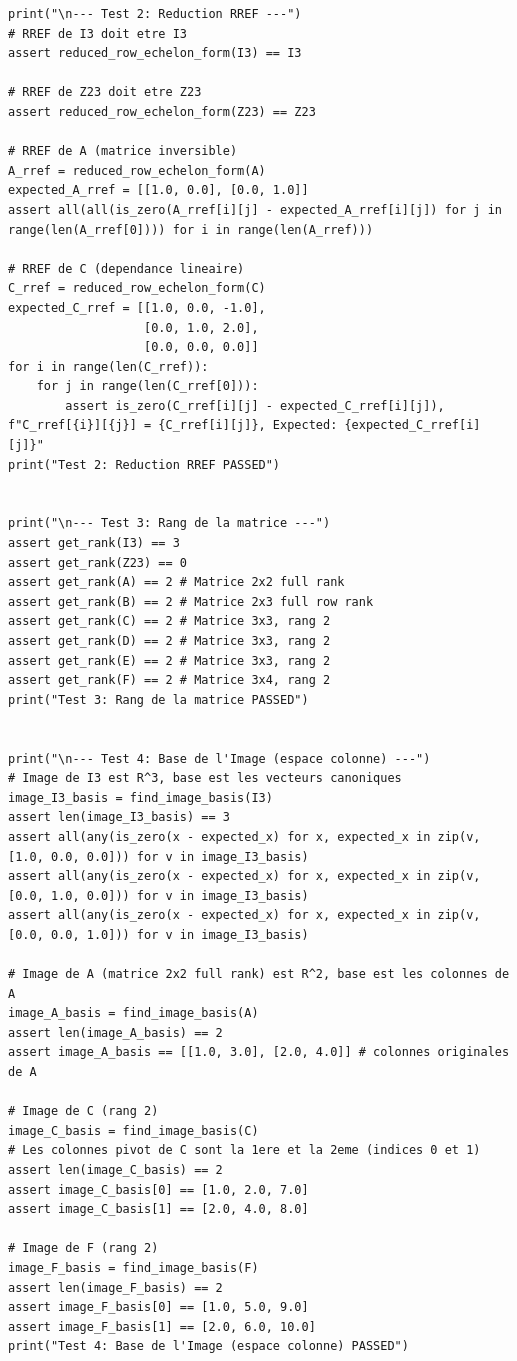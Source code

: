\documentclass{report}
\begin{document}
\begin{verbatim}
print("\n--- Test 2: Reduction RREF ---")
# RREF de I3 doit etre I3
assert reduced_row_echelon_form(I3) == I3

# RREF de Z23 doit etre Z23
assert reduced_row_echelon_form(Z23) == Z23

# RREF de A (matrice inversible)
A_rref = reduced_row_echelon_form(A)
expected_A_rref = [[1.0, 0.0], [0.0, 1.0]]
assert all(all(is_zero(A_rref[i][j] - expected_A_rref[i][j]) for j in range(len(A_rref[0]))) for i in range(len(A_rref)))

# RREF de C (dependance lineaire)
C_rref = reduced_row_echelon_form(C)
expected_C_rref = [[1.0, 0.0, -1.0],
                   [0.0, 1.0, 2.0],
                   [0.0, 0.0, 0.0]]
for i in range(len(C_rref)):
    for j in range(len(C_rref[0])):
        assert is_zero(C_rref[i][j] - expected_C_rref[i][j]), f"C_rref[{i}][{j}] = {C_rref[i][j]}, Expected: {expected_C_rref[i][j]}"
print("Test 2: Reduction RREF PASSED")


print("\n--- Test 3: Rang de la matrice ---")
assert get_rank(I3) == 3
assert get_rank(Z23) == 0
assert get_rank(A) == 2 # Matrice 2x2 full rank
assert get_rank(B) == 2 # Matrice 2x3 full row rank
assert get_rank(C) == 2 # Matrice 3x3, rang 2
assert get_rank(D) == 2 # Matrice 3x3, rang 2
assert get_rank(E) == 2 # Matrice 3x3, rang 2
assert get_rank(F) == 2 # Matrice 3x4, rang 2
print("Test 3: Rang de la matrice PASSED")


print("\n--- Test 4: Base de l'Image (espace colonne) ---")
# Image de I3 est R^3, base est les vecteurs canoniques
image_I3_basis = find_image_basis(I3)
assert len(image_I3_basis) == 3
assert all(any(is_zero(x - expected_x) for x, expected_x in zip(v, [1.0, 0.0, 0.0])) for v in image_I3_basis)
assert all(any(is_zero(x - expected_x) for x, expected_x in zip(v, [0.0, 1.0, 0.0])) for v in image_I3_basis)
assert all(any(is_zero(x - expected_x) for x, expected_x in zip(v, [0.0, 0.0, 1.0])) for v in image_I3_basis)

# Image de A (matrice 2x2 full rank) est R^2, base est les colonnes de A
image_A_basis = find_image_basis(A)
assert len(image_A_basis) == 2
assert image_A_basis == [[1.0, 3.0], [2.0, 4.0]] # colonnes originales de A

# Image de C (rang 2)
image_C_basis = find_image_basis(C)
# Les colonnes pivot de C sont la 1ere et la 2eme (indices 0 et 1)
assert len(image_C_basis) == 2
assert image_C_basis[0] == [1.0, 2.0, 7.0]
assert image_C_basis[1] == [2.0, 4.0, 8.0]

# Image de F (rang 2)
image_F_basis = find_image_basis(F)
assert len(image_F_basis) == 2
assert image_F_basis[0] == [1.0, 5.0, 9.0]
assert image_F_basis[1] == [2.0, 6.0, 10.0]
print("Test 4: Base de l'Image (espace colonne) PASSED")



\end{verbatim}
\end{document}
